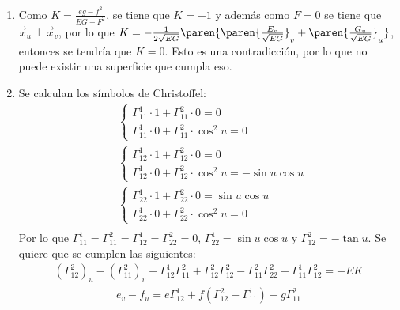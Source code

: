 \documentclass{homework}
\begin{document}
\begin{sol}
    \begin{enumerate}
        \item Como \(K=\frac{eg-f^2}{EG-F^2}\), se tiene que \(K=-1\) y además como \(F=0\) se tiene que \(\vec{x}_u\perp\vec{x}_v\), por lo que \(K=-\frac1{2\sqrt{EG}}\paren{\paren{\frac{E_v}{\sqrt{EG}}}_v+\paren{\frac{G_u}{\sqrt{EG}}}_u}\), entonces se tendría que \(K=0\). Esto es una contradicción, por lo que no puede existir una superficie que cumpla eso.
        \item Se calculan los símbolos de Christoffel:
              \begin{align*}
                   & \begin{cases}
                      \Gamma^1_{1 1}\cdot 1+\Gamma^2_{1 1}\cdot 0=0 \\
                      \Gamma^1_{1 1}\cdot 0+\Gamma^2_{1 1}\cdot \cos^2 u=0
                  \end{cases}  \\
                   & \begin{cases}
                      \Gamma^1_{1 2}\cdot 1+\Gamma^2_{1 2}\cdot 0=0 \\
                      \Gamma^1_{1 2}\cdot 0+\Gamma^2_{1 2}\cdot \cos^2 u=-\sin u\cos u
                  \end{cases}  \\
                   & \begin{cases}
                      \Gamma^1_{2 2}\cdot 1+\Gamma^2_{2 2}\cdot 0=\sin u\cos u \\
                      \Gamma^1_{2 2}\cdot 0+\Gamma^2_{2 2}\cdot \cos^2 u=0
                  \end{cases} \\
              \end{align*}
              Por lo que \(\Gamma^1_{1 1}=\Gamma^2_{1 1}=\Gamma^1_{1 2}=\Gamma^2_{2 2}=0\), \(\Gamma^1_{2 2}=\sin u\cos u\) y \(\Gamma^2_{1 2}=-\tan u\). Se quiere que se cumplen las siguientes:
              \begin{align*}
                  (\Gamma^2_{1 2})_u-(\Gamma^2_{1 1})_v+\Gamma^1_{1 2}\Gamma^2_{1 1}+\Gamma^2_{1 2}\Gamma^2_{1 2}-\Gamma^2_{1 1}\Gamma^2_{2 2}-\Gamma^1_{1 1}\Gamma^2_{1 2}=-EK
              \end{align*}
              \begin{align*}
                  e_v-f_u=e\Gamma^1_{1 2}+f(\Gamma^2_{1 2}-\Gamma^1_{1 1})-g\Gamma^2_{1 1} \\

\end{align*}
\end{enumerate}
\end{sol}
\end{document}
